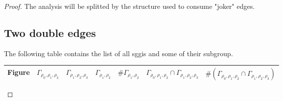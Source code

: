 \begin{proof}
  The analysis will be splitted by the structure used to consume "joker" edges.

  \subsection{Two double edges}

  The following table contains the list of all sggis and some of their subgroup.


\begin{table}[H]
  \centering
  \begin{tabular}{|c|c|c|c|c|c|c|}
    \hline
    Figure & $\Gamma_{\rho_0,\rho_1,\rho_2}$ & $\Gamma_{\rho_1,\rho_2,\rho_3}$ & $\Gamma_{\rho_1,\rho_2}$ & $\#\Gamma_{\rho_1,\rho_2}$ & $\Gamma_{\rho_0,\rho_1,\rho_2} \cap \Gamma_{\rho_1,\rho_2,\rho_3}$ & $\#(\Gamma_{\rho_0,\rho_1,\rho_2} \cap \Gamma_{\rho_1,\rho_2,\rho_3})$ \\ \hline


\end{tabular}
\end{table}
\end{proof}
